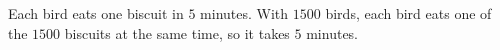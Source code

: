Each bird eats one biscuit in $5$ minutes. With $1500$ birds, each bird eats one of the $1500$ biscuits at the same time, so it takes $\boxed{5}$ minutes.
